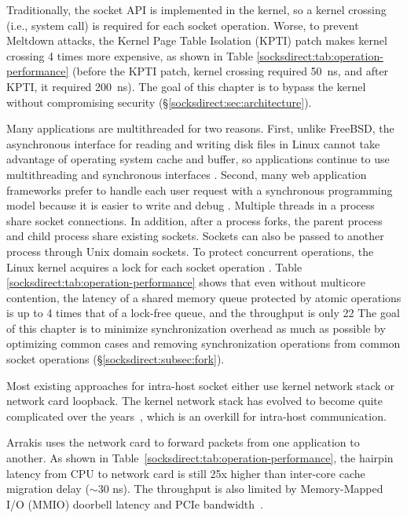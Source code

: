 Traditionally, the socket API is implemented in the kernel, so a kernel crossing (i.e., system call) is required for each socket operation. Worse, to prevent Meltdown \cite {Lipp2018meltdown} attacks, the Kernel Page Table Isolation (KPTI) patch \cite {kpti} makes kernel crossing 4 times more expensive, as shown in Table \ref {socksdirect:tab:operation-performance} (before the KPTI patch, kernel crossing required 50~ns, and after KPTI, it required 200~ns).
The goal of this chapter is to bypass the kernel without compromising security (\S\ref{socksdirect:sec:architecture}).

Many applications are multithreaded for two reasons.
First, unlike FreeBSD, the asynchronous interface for reading and writing disk files in Linux cannot take advantage of operating system cache and buffer, so applications continue to use multithreading and synchronous interfaces \cite {nginx-multi-thread}.
Second, many web application frameworks prefer to handle each user request with a synchronous programming model because it is easier to write and debug \cite {barroso2017attack}.
Multiple threads in a process share socket connections. In addition, after a process forks, the parent process and child process share existing sockets. Sockets can also be passed to another process through Unix domain sockets. To protect concurrent operations, the Linux kernel acquires a lock for each socket operation \cite {boyd2010analysis,han2012megapipe,lin2016scalable}. Table \ref {socksdirect:tab:operation-performance} shows that even without multicore contention, the latency of a shared memory queue protected by atomic operations is up to 4 times that of a lock-free queue, and the throughput is only 22%
The goal of this chapter is to minimize synchronization overhead as much as possible by optimizing common cases and removing synchronization operations from common socket operations (\S\ref{socksdirect:subsec:fork}).

Most existing approaches for intra-host socket either use kernel network stack or network card loopback.
The kernel network stack has evolved to become quite complicated over the years~\cite{yasukata2016stackmap}, which is an overkill for intra-host communication. %

Arrakis uses the network card to forward packets from one application to another.
As shown in Table~\ref{socksdirect:tab:operation-performance}, the hairpin latency from CPU to network card is still 25x higher than inter-core cache migration delay ($\sim$30 ns). The throughput is also limited by Memory-Mapped I/O (MMIO) doorbell latency and PCIe bandwidth~\cite{neugebauer2018understanding,li2017kv}.

